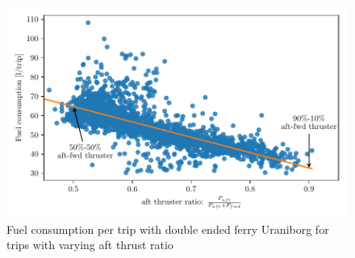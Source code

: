 \documentclass[fleqn,10pt]{olplainarticle}
\begin{document}
\begin{figure}[!htb]
    \centering
    \includegraphics[width=\textwidth]{figures/correlation.pdf}
    \caption{Fuel consumption per trip with double ended ferry Uraniborg for trips with varying aft thrust ratio}
    \label{fig:my_label}
\end{figure}




\end{document}
